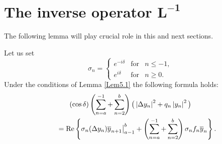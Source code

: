 \documentclass[pdftex]{sigma}
\numberwithin{equation}{section}
\begin{document}
\section[The inverse operator $L^{-1}$]{The inverse operator $\boldsymbol{L^{-1}}$}\label{section6}

The following lemma will play crucial role in this and next sections.

\begin{lemma}
\label{Lem6.1} Let us set%
\begin{equation}
\sigma _{n}=\left\{
\begin{array}{lll}
e^{-i\delta } & \text{for} & n\leq -1, \\
e^{i\delta } & \text{for} & n\geq 0.%
\end{array}%
\right.  \label{6.1}
\end{equation}%
Under the conditions of Lemma {\rm \ref{Lem5.1}} the following formula holds:%
\begin{gather}
(\cos \delta )\left( \sum_{n=a}^{-1}+\sum_{n=2}^{b}\right) \big(
\left\vert \Delta y_{n}\right\vert ^{2}+q_{n}\left\vert y_{n}\right\vert
^{2}\big)  \nonumber \\
\qquad ={\rm Re}\left\{ \sigma _{n}(\Delta y_{n})\overline{y}_{n+1}\big|
_{a-1}^{b}+\left( \sum_{n=a}^{-1}+\sum_{n=2}^{b}\right) \sigma _{n}f_{n}%
\overline{y}_{n}\right\} .  \label{6.2}
\end{gather}
\end{lemma}
\end{document}
